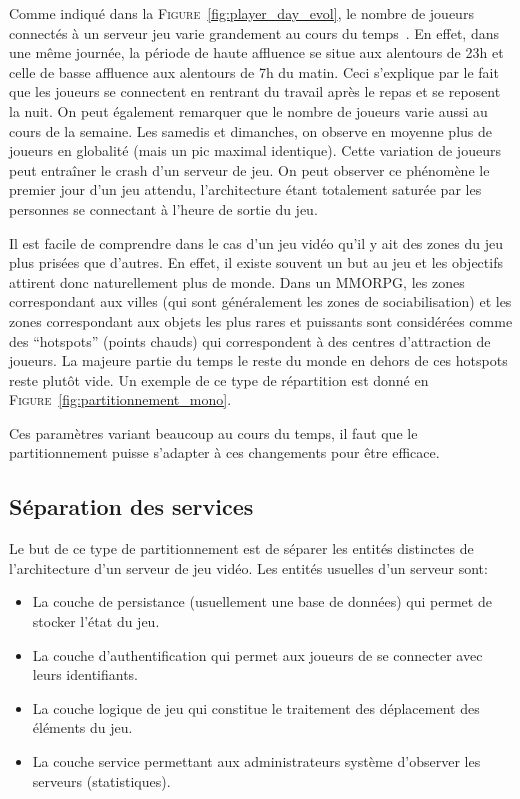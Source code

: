 Comme indiqué dans la \textsc{Figure}~\ref{fig:player_day_evol}, le nombre de joueurs connectés à un serveur jeu varie grandement au cours du temps~\cite{is_server_consolidation_benefical}.
En effet, dans une même journée, la période de haute affluence se situe aux alentours de 23h et celle de basse affluence aux alentours de 7h du matin.
Ceci s'explique par le fait que les joueurs se connectent en rentrant du travail après le repas et se reposent la nuit.
On peut également remarquer que le nombre de joueurs varie aussi au cours de la semaine.
Les samedis et dimanches, on observe en moyenne plus de joueurs en globalité (mais un pic maximal identique).
Cette variation de joueurs peut entraîner le crash d'un serveur de jeu.
On peut observer ce phénomène le premier jour d'un jeu attendu, l'architecture étant totalement saturée par les personnes se connectant à l'heure de sortie du jeu.

Il est facile de comprendre dans le cas d'un jeu vidéo qu'il y ait des zones du jeu plus prisées que d'autres.
En effet, il existe souvent un but au jeu et les objectifs attirent donc naturellement plus de monde.
Dans un MMORPG, les zones correspondant aux villes (qui sont généralement les zones de sociabilisation) et les zones correspondant aux objets les plus rares et puissants sont considérées comme des ``hotspots'' (points chauds) qui correspondent à des centres d'attraction de joueurs.
La majeure partie du temps le reste du monde en dehors de ces hotspots reste plutôt vide.
Un exemple de ce type de répartition est donné en \textsc{Figure}~\ref{fig:partitionnement_mono}.

Ces paramètres variant beaucoup au cours du temps, il faut que le partitionnement puisse s'adapter à ces changements pour être efficace.

\subsection{Séparation des services}
Le but de ce type de partitionnement est de séparer les entités distinctes de l'architecture d'un serveur de jeu vidéo.
Les entités usuelles d'un serveur sont:

\begin{itemize}
	\item La couche de persistance (usuellement une base de données) qui permet de stocker l'état du jeu.
	\item La couche d'authentification qui permet aux joueurs de se connecter avec leurs identifiants.
	\item La couche logique de jeu qui constitue le traitement des déplacement des éléments du jeu.
	\item La couche service permettant aux administrateurs système d'observer les serveurs (statistiques).
\end{itemize}

